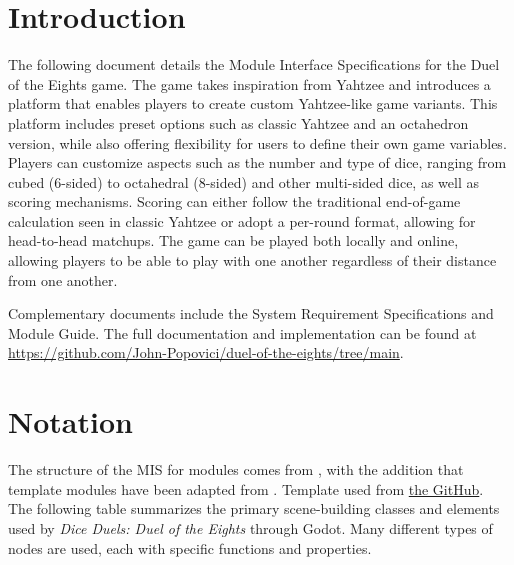 \documentclass[12pt, titlepage]{article}
\begin{document}
\section{Introduction}

The following document details the Module Interface Specifications for the Duel of the Eights game. The game takes inspiration from Yahtzee and introduces a platform that enables players to create custom Yahtzee-like game variants. This platform includes preset options such as classic Yahtzee and an octahedron version, while also offering flexibility for users to define their own game variables. Players can customize aspects such as the number and type of dice, ranging from cubed (6-sided) to octahedral (8-sided) and other multi-sided dice, as well as scoring mechanisms. Scoring can either follow the traditional end-of-game calculation seen in classic Yahtzee or adopt a per-round format, allowing for head-to-head matchups. The game can be played both locally and online, allowing players to be able to play with one another regardless of their distance from one another.

Complementary documents include the System Requirement Specifications
and Module Guide.  The full documentation and implementation can be
found at \url{https://github.com/John-Popovici/duel-of-the-eights/tree/main}.  

\newpage
\section{Notation}


The structure of the MIS for modules comes from \citet{HoffmanAndStrooper1995},
with the addition that template modules have been adapted from
\cite{GhezziEtAl2003}. Template used from \href{https://github.com/smiths/capTemplate}{the \progname GitHub}.\\

The following table summarizes the primary scene-building classes and elements used by \textit{Dice Duels: Duel of the Eights} through Godot. Many different types of nodes are used, each with specific functions and properties.
\end{document}
